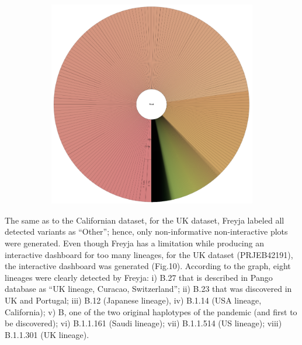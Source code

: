 \begin{figure}[H]
\begin{subfigure}[b]{0.52\textwidth}
        \label{fig:results:real:krona-uk-b}
        \end{subfigure}
        \hfill
        \begin{subfigure}[b]{0.45\textwidth}
        \includegraphics[width=1\textwidth]{figures/results/real/krona/krona-uk-all.png}
        \label{fig:results:real:krona-uk-c}
        \end{subfigure}
    \end{figure}
    
    The same as to the Californian dataset, for the UK dataset, Freyja labeled all detected variants as “Other”; hence, only non-informative non-interactive plots were generated. Even though Freyja has a limitation while producing an interactive dashboard for too many lineages, for the UK dataset (PRJEB42191), the interactive dashboard was generated (Fig.10). According to the graph, eight lineages were clearly detected by Freyja: i) B.27 that is described in Pango database as “UK lineage, Curacao, Switzerland”; ii) B.23 that was discovered in UK and Portugal; iii) B.12 (Japanese lineage), iv) B.1.14 (USA lineage, California); v) B, one of the two original haplotypes of the pandemic (and first to be discovered); vi) B.1.1.161 (Saudi lineage); vii) B.1.1.514 (US lineage); viii) B.1.1.301 (UK lineage). 
    
